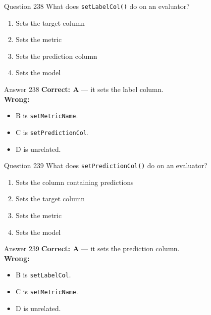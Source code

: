 \documentclass[aspectratio=169,11pt]{beamer}
\begin{document}
	\begin{frame}{Question 238}
		What does \texttt{setLabelCol()} do on an evaluator?
		\begin{enumerate}[label=\Alph*.]
			\item Sets the target column
			\item Sets the metric
			\item Sets the prediction column
			\item Sets the model
		\end{enumerate}
	\end{frame}
	\begin{frame}{Answer 238}
		\textbf{Correct: A} --- it sets the label column.\\
		\vspace{0.5em}
		\textbf{Wrong:}
		\begin{itemize}
			\item B is \texttt{setMetricName}.
			\item C is \texttt{setPredictionCol}.
			\item D is unrelated.
		\end{itemize}
	\end{frame}
	
	\begin{frame}{Question 239}
		What does \texttt{setPredictionCol()} do on an evaluator?
		\begin{enumerate}[label=\Alph*.]
			\item Sets the column containing predictions
			\item Sets the target column
			\item Sets the metric
			\item Sets the model
		\end{enumerate}
	\end{frame}
	\begin{frame}{Answer 239}
		\textbf{Correct: A} --- it sets the prediction column.\\
		\vspace{0.5em}
		\textbf{Wrong:}
		\begin{itemize}
			\item B is \texttt{setLabelCol}.
			\item C is \texttt{setMetricName}.
			\item D is unrelated.
		\end{itemize}
	\end{frame}
	
\end{document}
